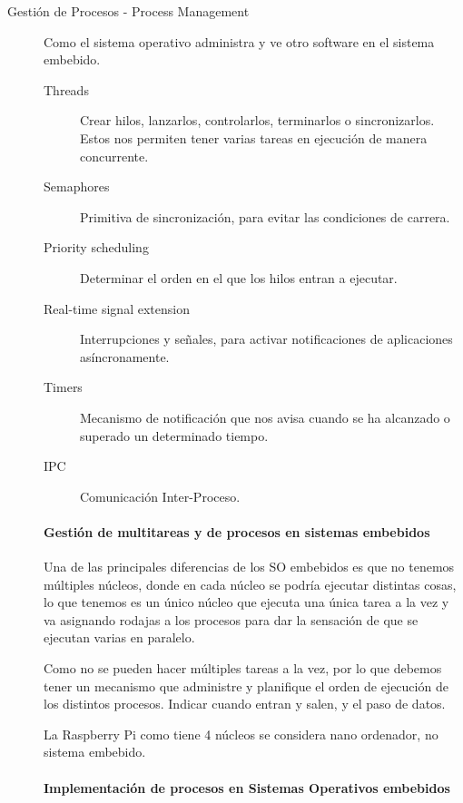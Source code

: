 \documentclass[12pt, twoside, openright]{report} %
\begin{document}
\begin{description}
	\item[Gestión de Procesos - Process Management] Como el sistema operativo administra y ve otro software en el sistema embebido.

	      \begin{description}
		      \item[Threads] Crear hilos, lanzarlos, controlarlos, terminarlos o sincronizarlos. Estos nos permiten tener varias tareas en ejecución de manera concurrente.
		      \item[Semaphores] Primitiva de sincronización, para evitar las condiciones de carrera.
		      \item[Priority scheduling] Determinar el orden en el que los hilos entran a ejecutar.
		      \item[Real-time signal extension] Interrupciones y señales, para activar notificaciones de aplicaciones asíncronamente.
		      \item[Timers] Mecanismo de notificación que nos avisa cuando se ha alcanzado o superado un determinado tiempo.
		      \item[IPC] Comunicación Inter-Proceso.
	      \end{description}

	      \paragraph{Gestión de multitareas y de procesos en sistemas embebidos}

	      Una de las principales diferencias de los SO embebidos es que no tenemos múltiples núcleos, donde en cada núcleo se podría ejecutar distintas cosas, lo que tenemos es un único núcleo que ejecuta una única tarea a la vez y va asignando rodajas a los procesos para dar la sensación de que se ejecutan varias en paralelo.

	      Como no se pueden hacer múltiples tareas a la vez, por lo que debemos tener un mecanismo que administre y planifique el orden de ejecución de los distintos procesos. Indicar cuando entran y salen, y el paso de datos.

	      La Raspberry Pi como tiene 4 núcleos se considera nano ordenador, no sistema embebido.


	      \paragraph{Implementación de procesos en Sistemas Operativos embebidos}


\end{description}
\end{document}

